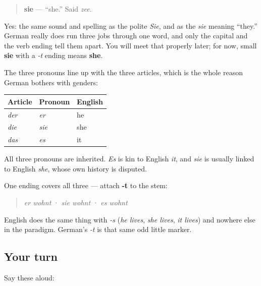 \begin{cousinweb}
\begin{quote}
\textbf{sie} — \textquotedblleft{}she.\textquotedblright{} Said \emph{zee}.
\end{quote}

Yes: the same sound and spelling as the polite \emph{Sie}, and as the \emph{sie} meaning \textquotedblleft{}they.\textquotedblright{} German really does run three jobs through one word, and only the capital and the verb ending tell them apart. You will meet that properly later; for now, small \textbf{sie} with a \emph{-t} ending means \textbf{she}.

The three pronouns line up with the three articles, which is the whole reason German bothers with genders:

\noindent
\begin{tabularx}{\linewidth}{@{}>{\raggedright\arraybackslash}X>{\raggedright\arraybackslash}X>{\raggedright\arraybackslash}X@{}}
\toprule
\textbf{Article} & \textbf{Pronoun} & \textbf{English} \\
\midrule
\emph{der} & \emph{er} & he \\
\emph{die} & \emph{sie} & she \\
\emph{das} & \emph{es} & it \\
\bottomrule
\end{tabularx}

All three pronouns are inherited. \emph{Es} is kin to English \emph{it}, and \emph{sie} is usually linked to English \emph{she}, whose own history is disputed.
\end{cousinweb}

\begin{grammarlens}[title={Grammar Lens: all three take -t}]
One ending covers all three — attach \textbf{-t} to the stem:

\begin{quote}
\emph{er wohnt} · \emph{sie wohnt} · \emph{es wohnt}
\end{quote}

English does the same thing with \emph{-s} (\emph{he lives}, \emph{she lives}, \emph{it lives}) and nowhere else in the paradigm. German's \emph{-t} is that same odd little marker.
\end{grammarlens}

\subsection*{Your turn}
Say these aloud:

